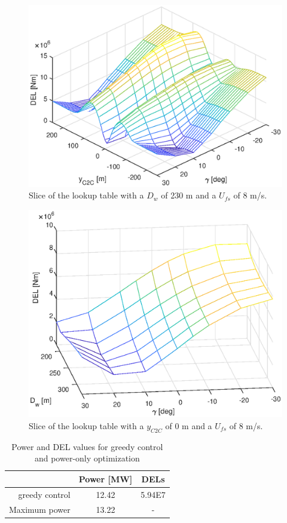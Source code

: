 \begin{figure}
	\includegraphics[width=\linewidth]{./Figures/LUTslice_Dw230_Ufs8.eps}
	\caption{Slice of the lookup table with a $D_{w}$ of 230 m and a $U_{fs}$ of 8 m/s. }
	\label{fig:LUTsliceC2C}
\end{figure}

\begin{figure}
	\includegraphics[width=\linewidth]{./Figures/LUTslice_yWake0_Ufs8.eps}
	\caption{Slice of the lookup table with a $y_{C2C}$ of 0 m and a $U_{fs}$ of 8 m/s. }
	\label{fig:LUTsliceDw}
\end{figure}

\begin{table}[t]
	\caption{Power and DEL values for greedy control and power-only optimization}
	\centering
	\label{tab:reference results}
	\begin{tabular}{rcc}
		\hline
		& Power [MW] & DELs \\ 
		\hline
		greedy control & 12.42 & 5.94E7 \\
		Maximum power & 13.22 & - \\
		\hline
	\end{tabular}
\end{table}

